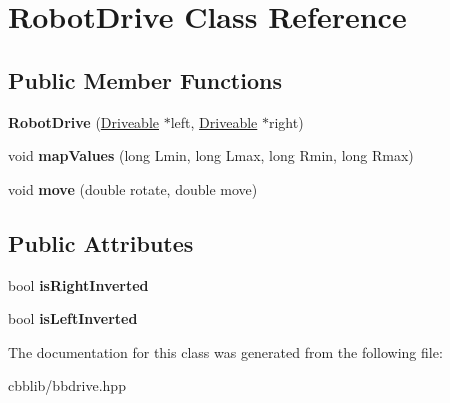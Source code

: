 \hypertarget{classRobotDrive}{\section{\-Robot\-Drive \-Class \-Reference}
\label{classRobotDrive}
}
\subsection*{\-Public \-Member \-Functions}
\begin{DoxyCompactItemize}
\item 
\hypertarget{classRobotDrive_a0a095ac84fe17aa7fbbb2f04af0e6008}{{\bfseries \-Robot\-Drive} (\hyperlink{classDriveable}{\-Driveable} $\ast$left, \hyperlink{classDriveable}{\-Driveable} $\ast$right)}\label{classRobotDrive_a0a095ac84fe17aa7fbbb2f04af0e6008}

\item 
\hypertarget{classRobotDrive_aee78ff8e09a87134c1c9ed2cb8568100}{void {\bfseries map\-Values} (long \-Lmin, long \-Lmax, long \-Rmin, long \-Rmax)}\label{classRobotDrive_aee78ff8e09a87134c1c9ed2cb8568100}

\item 
\hypertarget{classRobotDrive_a443b235235600dfdbb8b627ee0eb4ba6}{void {\bfseries move} (double rotate, double move)}\label{classRobotDrive_a443b235235600dfdbb8b627ee0eb4ba6}

\end{DoxyCompactItemize}
\subsection*{\-Public \-Attributes}
\begin{DoxyCompactItemize}
\item 
\hypertarget{classRobotDrive_a692b1e5d05c735b58035ef319a2ab85a}{bool {\bfseries is\-Right\-Inverted}}\label{classRobotDrive_a692b1e5d05c735b58035ef319a2ab85a}

\item 
\hypertarget{classRobotDrive_adf03fe8c02a8d01065d683434256fa66}{bool {\bfseries is\-Left\-Inverted}}\label{classRobotDrive_adf03fe8c02a8d01065d683434256fa66}

\end{DoxyCompactItemize}


\-The documentation for this class was generated from the following file\-:\begin{DoxyCompactItemize}
\item 
cbblib/bbdrive.\-hpp\end{DoxyCompactItemize}
